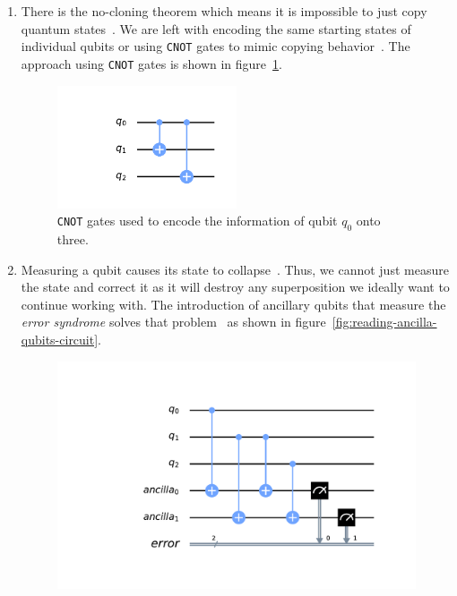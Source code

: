 \begin{enumerate}
    \item There is the no-cloning theorem which means it is impossible to just copy quantum states~\cite[p. 460]{benenti2004principles}.
    We are left with encoding the same starting states of individual qubits or using \texttt{CNOT} gates to mimic copying behavior~\cite[p. 461]{benenti2004principles}.
    The approach using \texttt{CNOT} gates is shown in figure~\ref{fig:cnot-circuit}.
    \begin{figure}[H]
        \centering
        \includegraphics[width=0.5\textwidth]{res/cnot_circuit.pdf}
        \caption{\texttt{CNOT} gates used to encode the information of qubit \(q_0\) onto three.}
        \label{fig:cnot-circuit}
    \end{figure}
    \item Measuring a qubit causes its state to collapse~\cite[p. 460]{benenti2004principles}.
    Thus, we cannot just measure the state and correct it as it will destroy any superposition we ideally want to continue working with.
    The introduction of ancillary qubits that measure the \emph{error syndrome} solves that problem~\cite[p. 463]{benenti2004principles} as shown in figure~\ref{fig:reading-ancilla-qubits-circuit}.
    \begin{figure}[H]
        \centering
        \includegraphics[width=\textwidth]{res/reading_ancilla_qubits_circuit.pdf}

\end{figure}
\end{enumerate}
